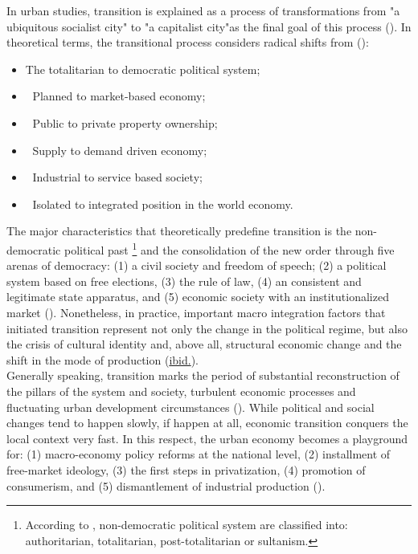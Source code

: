 \documentclass[11pt]{report}
\begin{document}
{{{{In urban studies, transition is explained as a process of transformations from "a ubiquitous socialist city" to "a capitalist city"as the final goal of this process (\href{Nenadovic}{\citealt{nedovic-budic_mornings_2011}}).
In theoretical terms, the transitional process considers radical shifts from (\href{Petrovic}{\citealt{petrovic_cities_2009}}): 

\begin{itemize}
\item The totalitarian to democratic political system;
\item Planned to market-based economy;
\item Public to private property ownership; 
\item Supply to demand driven economy; 
\item Industrial to service based society;
\item Isolated to integrated position in the world economy.
\end{itemize}

The major characteristics that theoretically predefine transition is the non-democratic political past
\footnote{According to \href{Linz}{\cite{Linz and Stepan (1996)}}, non-democratic political system are classified into: authoritarian, totalitarian, post-totalitarian or sultanism.}
and the consolidation of the new order through five arenas of democracy:
(1) a civil society and freedom of speech;
(2) a political system based on free elections,
(3) the rule of law,
(4) an consistent and legitimate state apparatus, and
(5) economic society with an institutionalized market (\href{Thomas}{\citealt{thomas_thinking_1998}}).
Nonetheless, in practice, important macro integration factors that initiated transition represent not only the change in the political regime, but also the crisis of cultural identity and, above all, structural economic change and the shift in the mode of production (\href{Thomas}{ibid.}).
\\

Generally speaking, transition marks the period of substantial reconstruction of the pillars of the system and society, turbulent economic processes and fluctuating  urban development circumstances (\href{Nedovic}{\citealt{nedovic-budic_mornings_2011}}).
While political and social changes tend to happen slowly, if happen at all, economic transition conquers the local context very fast. 
In this respect, the urban economy becomes a playground for: (1) macro-economy policy reforms at the national level, (2) installment of free-market ideology, (3) the first steps in privatization, (4) promotion of consumerism, and (5) dismantlement of industrial production (\href{ref}{\citealt{world_bank_cities_2000}}).
\\

}}}}
\end{document}
